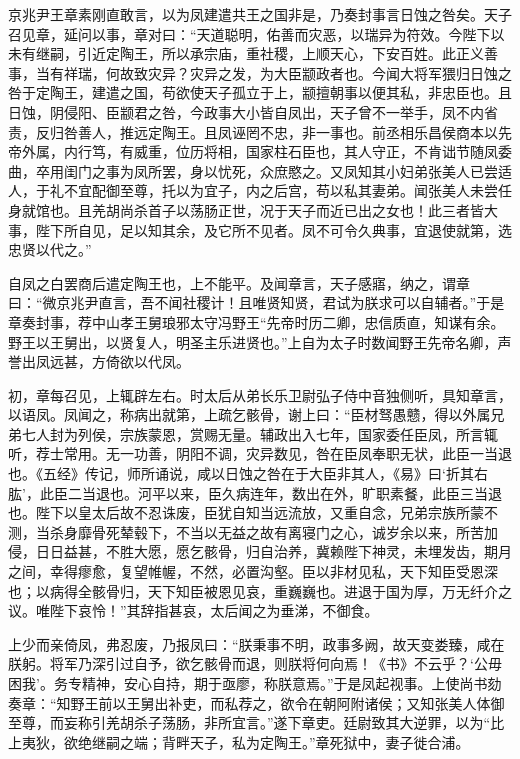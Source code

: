 \documentclass[12pt,UTF8]{ctexbook}
\begin{document}
京兆尹王章素刚直敢言，以为凤建遣共王之国非是，乃奏封事言日蚀之咎矣。天子召见章，延问以事，章对曰：“天道聪明，佑善而灾恶，以瑞异为符效。今陛下以未有继嗣，引近定陶王，所以承宗庙，重社稷，上顺天心，下安百姓。此正义善事，当有祥瑞，何故致灾异？灾异之发，为大臣颛政者也。今闻大将军猥归日蚀之咎于定陶王，建遣之国，苟欲使天子孤立于上，颛擅朝事以便其私，非忠臣也。且日蚀，阴侵阳、臣颛君之咎，今政事大小皆自凤出，天子曾不一举手，凤不内省责，反归咎善人，推远定陶王。且凤诬罔不忠，非一事也。前丞相乐昌侯商本以先帝外属，内行笃，有威重，位历将相，国家柱石臣也，其人守正，不肯诎节随凤委曲，卒用闺门之事为凤所罢，身以忧死，众庶愍之。又凤知其小妇弟张美人已尝适人，于礼不宜配御至尊，托以为宜子，内之后宫，苟以私其妻弟。闻张美人未尝任身就馆也。且羌胡尚杀首子以荡肠正世，况于天子而近已出之女也！此三者皆大事，陛下所自见，足以知其余，及它所不见者。凤不可令久典事，宜退使就第，选忠贤以代之。”



自凤之白罢商后遣定陶王也，上不能平。及闻章言，天子感寤，纳之，谓章曰：“微京兆尹直言，吾不闻社稷计！且唯贤知贤，君试为朕求可以自辅者。”于是章奏封事，荐中山孝王舅琅邪太守冯野王“先帝时历二卿，忠信质直，知谋有余。野王以王舅出，以贤复人，明圣主乐进贤也。”上自为太子时数闻野王先帝名卿，声誉出凤远甚，方倚欲以代凤。



初，章每召见，上辄辟左右。时太后从弟长乐卫尉弘子侍中音独侧听，具知章言，以语凤。凤闻之，称病出就第，上疏乞骸骨，谢上曰：“臣材驽愚戆，得以外属兄弟七人封为列侯，宗族蒙恩，赏赐无量。辅政出入七年，国家委任臣凤，所言辄听，荐士常用。无一功善，阴阳不调，灾异数见，咎在臣凤奉职无状，此臣一当退也。《五经》传记，师所诵说，咸以日蚀之咎在于大臣非其人，《易》曰‘折其右肱’，此臣二当退也。河平以来，臣久病连年，数出在外，旷职素餐，此臣三当退也。陛下以皇太后故不忍诛废，臣犹自知当远流放，又重自念，兄弟宗族所蒙不测，当杀身靡骨死辇毂下，不当以无益之故有离寝门之心，诚岁余以来，所苦加侵，日日益甚，不胜大愿，愿乞骸骨，归自治养，冀赖陛下神灵，未埋发齿，期月之间，幸得瘳愈，复望帷幄，不然，必置沟壑。臣以非材见私，天下知臣受恩深也；以病得全骸骨归，天下知臣被恩见哀，重巍巍也。进退于国为厚，万无纤介之议。唯陛下哀怜！”其辞指甚哀，太后闻之为垂涕，不御食。



上少而亲倚凤，弗忍废，乃报凤曰：“朕秉事不明，政事多阙，故天变娄臻，咸在朕躬。将军乃深引过自予，欲乞骸骨而退，则朕将何向焉！《书》不云乎？‘公毋困我’。务专精神，安心自持，期于亟廖，称朕意焉。”于是凤起视事。上使尚书劾奏章：“知野王前以王舅出补吏，而私荐之，欲令在朝阿附诸侯；又知张美人体御至尊，而妄称引羌胡杀子荡肠，非所宜言。”遂下章吏。廷尉致其大逆罪，以为“比上夷狄，欲绝继嗣之端；背畔天子，私为定陶王。”章死狱中，妻子徙合浦。
\end{document}
